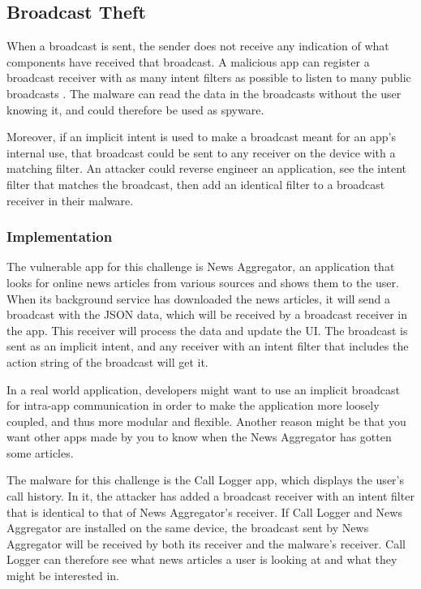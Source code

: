     \subsection{Broadcast Theft}
        \label{subsec:broadcast_theft}
        
    When a broadcast is sent, the sender does not receive any indication of what components have received that broadcast. A malicious app can register a broadcast receiver with as many intent filters as possible to listen to many public broadcasts \cite{2010_icc_paper}. The malware can read the data in the broadcasts without the user knowing it, and could therefore be used as spyware. 
    
    Moreover, if an implicit intent is used to make a broadcast meant for an app’s internal use, that broadcast could be sent to any receiver on the device with a matching filter. An attacker could reverse engineer an application, see the intent filter that matches the broadcast, then add an identical filter to a broadcast receiver in their malware.
    
    \subsubsection{Implementation}
        \label{subsubsec:broadcast_theft_implementation}
        
    The vulnerable app for this challenge is News Aggregator, an application that looks for online news articles from various sources and shows them to the user. When its background service has downloaded the news articles, it will send a broadcast with the JSON data, which will be received by a broadcast receiver in the app. This receiver will process the data and update the UI. The broadcast is sent as an implicit intent, and any receiver with an intent filter that includes the action string of the broadcast will get it.
    
    In a real world application, developers might want to use an implicit broadcast for intra-app communication in order to make the application more loosely coupled, and thus more modular and flexible. Another reason might be that you want other apps made by you to know when the News Aggregator has gotten some articles.

    The malware for this challenge is the Call Logger app, which displays the user's call history. In it, the attacker has added a broadcast receiver with an intent filter that is identical to that of News Aggregator's receiver. If Call Logger and News Aggregator are installed on the same device, the broadcast sent by News Aggregator will be received by both its receiver and the malware's receiver. Call Logger can therefore see what news articles a user is looking at and what they might be interested in.
    
